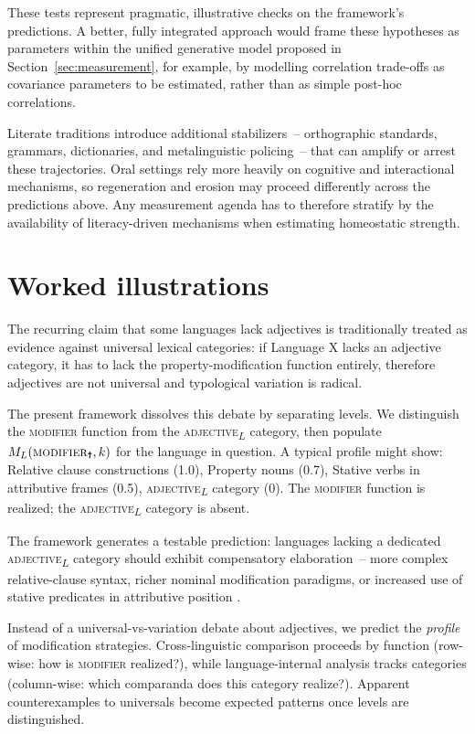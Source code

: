\documentclass[12pt]{article}
\begin{document}
These tests represent pragmatic, illustrative checks on the framework's predictions. A better, fully integrated approach would frame these hypotheses as parameters within the unified generative model proposed in Section~\ref{sec:measurement}, for example, by modelling correlation trade-offs as covariance parameters to be estimated, rather than as simple post-hoc correlations.

Literate traditions introduce additional stabilizers~-- orthographic standards, grammars, dictionaries, and metalinguistic policing~-- that can amplify or arrest these trajectories. Oral settings rely more heavily on cognitive and interactional mechanisms, so regeneration and erosion may proceed differently across the predictions above. Any measurement agenda has to therefore stratify by the availability of literacy-driven mechanisms when estimating homeostatic strength.

\section{Worked illustrations}\label{sec:illustrations}
The recurring claim that some languages lack adjectives is traditionally treated as evidence against universal lexical categories: if Language X lacks an adjective category, it has to lack the property-modification function entirely, therefore adjectives are not universal and typological variation is radical.

The present framework dissolves this debate by separating levels. We distinguish the \textsc{modifier}\textsubscript{\Cross} function from the \textsc{adjective}\textsubscript{$L$} category, then populate $M_L(\textsc{modifier}\textsubscript{\Cross}, k)$ for the language in question. A typical profile might show: Relative clause constructions (1.0), Property nouns (0.7), Stative verbs in attributive frames (0.5), \textsc{adjective}\textsubscript{$L$} category (0). The \textsc{modifier}\textsubscript{\Cross} function is realized; the \textsc{adjective}\textsubscript{$L$} category is absent.

The framework generates a testable prediction: languages lacking a dedicated \textsc{adjective}\textsubscript{$L$} category should exhibit compensatory elaboration~-- more complex relative-clause syntax, richer nominal modification paradigms, or increased use of stative predicates in attributive position \parencite{Dixon2010,Croft2001}.

Instead of a universal-vs-variation debate about adjectives, we predict the \emph{profile} of modification strategies. Cross-linguistic comparison proceeds by function (row-wise: how is \textsc{modifier}\textsubscript{\Cross} realized?), while language-internal analysis tracks categories (column-wise: which comparanda does this category realize?). Apparent counterexamples to universals become expected patterns once levels are distinguished.
\end{document}
